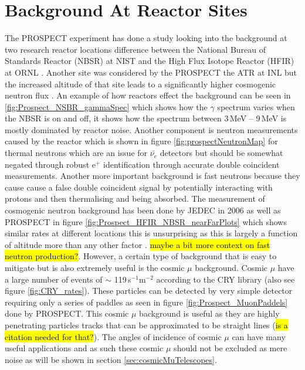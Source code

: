 \section{Background At Reactor Sites}
The PROSPECT experiment has done a  study looking into the background at two research reactor locations difference between the National Bureau of Standards Reactor (NBSR) at NIST and the High Flux Isotope Reactor (HFIR) at ORNL \cite{Ashenfelter_2016}. Another site was considered by the PROSPECT the ATR at INL but the increased altitude of that site leads to a significantly higher cosmogenic neutron flux \cite{Ashenfelter_2016}. An example of how reactors effect the background can be seen in \ref{fig:Prospect_NSBR_gammaSpec} which shows how the $\gamma$ spectrum varies when the NBSR is on and off, it shows how the spectrum between 3\,MeV -- 9\,MeV is mostly dominated by reactor noise. Another component is neutron measurements caused by the reactor which is shown in figure \ref{fig:prospectNeutronMap} for thermal neutrons which are an issue for $\bar{\nu_e}$ detectors but should be somewhat negated through robust e$^+$ identification through accurate double coincident measurements. Another more important background is fast neutrons because they cause cause a false double coincident signal by potentially interacting with protons and then thermalising and being absorbed. The measurement of cosmogenic neutron background has been done by JEDEC in 2006 \cite{JEDEC_2006} as well as PROSPECT in figure \ref{fig:Prospect_HFIR_NBSR_nearFarPlots} which shows similar rates at different locations this is unsurprising as this is largely a function of altitude more than any other factor \cite{Ashenfelter_2016}. \hl{maybe a bit more context on fast neutron production?}. However, a certain type of background that is easy to mitigate but is also extremely useful is the cosmic $\mu$ background. Cosmic $\mu$ have a large number of events of $\sim$ 119\,s$^{-1}$m$^{-2}$ according to the CRY library \cite{ieee_cry_2007} (also see figure \ref{fig:CRY_rates}). These particles can be detected by very simple detector requiring only a series of paddles as seen in figure \ref{fig:Prospect_MuonPaddels} done by PROSPECT. This cosmic $\mu$ background is useful as they are highly penetrating particles tracks that can be approximated to be straight lines (\hl{is a citation needed for that?}). The angles of incidence of cosmic $\mu$ can have many useful applications and as such these cosmic $\mu$ should not be excluded as mere noise as will be shown in section \ref{sec:cosmicMuTelescopes}.

